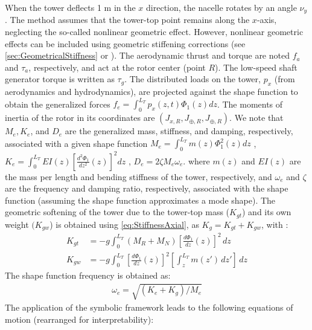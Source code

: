 \documentclass[wes, manuscript]{copernicus}
\begin{document}
When the tower deflects 1 \unit{m} in the $x$ direction, the nacelle rotates by an angle $\nu_y$.
The method assumes that the tower-top point remains along the $x$-axis, neglecting the so-called nonlinear geometric effect.
However, nonlinear geometric effects can be included using geometric stiffening corrections (see  \autoref{sec:GeometricalStiffness} or \cite{branlard:2019flex}).
The aerodynamic thrust and torque are noted $f_a$ and $\tau_a$, respectively, and act at the rotor center (point $R$).
The low-speed shaft generator torque is written as $\tau_g$.
The distributed loads on the tower, $p_x$ (from aerodynamics and hydrodynamics), are projected against the shape function to obtain the generalized forces 
  $f_e=\int_0^{L_T} p_x(z,t)\Phi_1(z) dz $.
The moments of inertia of the rotor in its coordinates are $(J_{x,R}, J_{\oplus,R}, J_{\oplus,R})$.
We note that $M_e, K_e$, and $D_e$ are the generalized mass, stiffness, and damping, respectively, associated with a given shape function
$M_e=\int_0^{L_T} m(z) \Phi_1^2(z) dz$
    ,
  $K_e=\int_0^{L_T} EI(z) \left[\frac{d^2\Phi_1}{dz^2}(z)\right]^2 dz$
,
    $D_e= 2 \zeta M_e \omega_e$.
where $m(z)$ and $EI(z)$ are the mass per length and bending stiffness of the tower, respectively, and $\omega_e$  and $\zeta$ are the frequency and damping ratio, respectively, associated with the shape function (assuming the shape function approximates a mode shape).
The geometric softening of the tower due to the tower-top mass ($K_{gt}$) and its own weight $(K_{gw}$) is obtained using \autoref{eq:StiffnessAxial}, as $K_g= K_{gt}+K_{gw}$, with :
\begin{align}
  K_{gt}&=- g \int_0^{L_T} (M_{R}+M_N)\left[\frac{d\Phi_1}{dz}(z)\right]^2\, dz
     \\
  K_{gw}&=- g \int_0^{L_T} \left[\frac{d\Phi_1}{dz}(z)\right]^2 \left[\int_z^{L_T} m(z')\,dz' \right]  \, dz
\end{align}
The shape function frequency is obtained as:
\begin{align}
    \omega_e = \sqrt{(K_e+K_g)/M_e}
\end{align}
The application of the symbolic framework leads to the following equations of motion (rearranged for interpretability):
\end{document}
